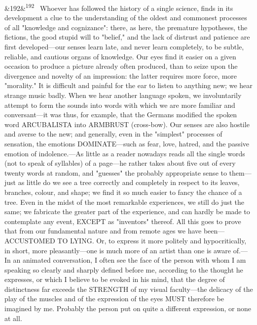 \documentclass[12pt]{article}
\newcommand{\para}[1][]{\par\noindent\ifx&#1&\else\textsuperscript{\footnotesize #1}~\fi}
\begin{document}
\para[192] Whoever has followed the history of a single science, finds in its development a clue to the understanding of the oldest and commonest processes of all "knowledge and cognizance": there, as here, the premature hypotheses, the fictions, the good stupid will to "belief," and the lack of distrust and patience are first developed---our senses learn late, and never learn completely, to be subtle, reliable, and cautious organs of knowledge. Our eyes find it easier on a given occasion to produce a picture already often produced, than to seize upon the divergence and novelty of an impression: the latter requires more force, more "morality." It is difficult and painful for the ear to listen to anything new; we hear strange music badly. When we hear another language spoken, we involuntarily attempt to form the sounds into words with which we are more familiar and conversant---it was thus, for example, that the Germans modified the spoken word ARCUBALISTA into ARMBRUST (cross-bow). Our senses are also hostile and averse to the new; and generally, even in the "simplest" processes of sensation, the emotions DOMINATE---such as fear, love, hatred, and the passive emotion of indolence.---As little as a reader nowadays reads all the single words (not to speak of syllables) of a page---he rather takes about five out of every twenty words at random, and "guesses" the probably appropriate sense to them---just as little do we see a tree correctly and completely in respect to its leaves, branches, colour, and shape; we find it so much easier to fancy the chance of a tree. Even in the midst of the most remarkable experiences, we still do just the same; we fabricate the greater part of the experience, and can hardly be made to contemplate any event, EXCEPT as "inventors" thereof. All this goes to prove that from our fundamental nature and from remote ages we have been---ACCUSTOMED TO LYING. Or, to express it more politely and hypocritically, in short, more pleasantly---one is much more of an artist than one is aware of.---In an animated conversation, I often see the face of the person with whom I am speaking so clearly and sharply defined before me, according to the thought he expresses, or which I believe to be evoked in his mind, that the degree of distinctness far exceeds the STRENGTH of my visual faculty---the delicacy of the play of the muscles and of the expression of the eyes MUST therefore be imagined by me. Probably the person put on quite a different expression, or none at all.
\end{document}
